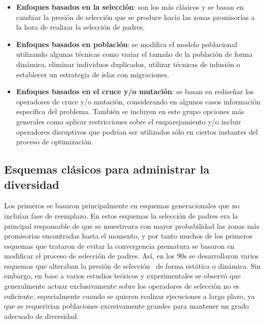 \begin{itemize}
\item \textbf{Enfoques basados en la selección}: son los más clásicos y se basan en cambiar la presión de selección que se produce hacia las zonas promisorias a la hora de realizar
la selección de padres.
\item \textbf{Enfoques basados en población}: se modifica el modelo poblacional utilizando algunas técnicas como variar el tamaño de la población de forma
dinámica, eliminar individuos duplicados, utilizar técnicas de infusión o establecer un estrategia de islas con migraciones.
\item \textbf{Enfoques basados en el cruce y/o mutación}: se basan en rediseñar los operadores de cruce y/o mutación, considerando en algunos casos información específica del problema. También se incluyen en este grupo opciones más generales como aplicar restricciones sobre el emparejamiento y/o incluir operadores disruptivos que podrían ser utilizados sólo en ciertos instantes del proceso
de optimización.
\end{itemize}


\subsection{Esquemas clásicos para administrar la diversidad}

Los primeros \EAS{} se basaron principalmente en esquemas generacionales que no incluían fase de reemplazo.
%
En estos esquemas la selección de padres era la principal responsable de que se muestreara con mayor probabilidad las zonas
más promisorias encontradas hasta el momento, y por tanto muchos de los primeros esquemas que trataron de evitar la convergencia 
prematura se basaron en modificar el proceso de selección de padres.
%
Así, en los 90s se desarrollaron varios esquemas que alteraban la presión de selección~\cite{eiben2003introduction}
de forma estática o dinámica.
%
Sin embargo, en base a varios estudios teóricos y experimentales se observó que generalmente actuar exclusivamente sobre los operadores de selección no es suficiente, especialmente
cuando se quieren realizar ejecuciones a largo plazo, ya que se requerirían poblaciones excesivamente grandes para mantener un grado adecuado de diversidad.

